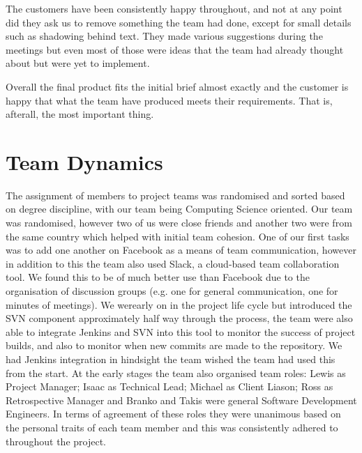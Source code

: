 \documentclass{l3proj}
\begin{document}
The customers have been consistently happy throughout, and not at any point did they ask us to remove something the team had done, except for small details such
as shadowing behind text. They made various suggestions during the meetings but even most of those were ideas that the team had already thought about but were
yet to implement.

Overall the final product fits the initial brief almost exactly and the customer is happy that what the team have produced meets their requirements. That
is, afterall, the most important thing.



\section{Team Dynamics}
\label{sec:team-dynamics}

The assignment of members to project teams was randomised and sorted based on degree discipline, with our team being
Computing Science oriented. Our team was randomised, however two of us were close friends and another two were from the
same country which helped with initial team cohesion. One of our first tasks was to add one another on Facebook as a means of
team communication, however in addition to this the team also used Slack, a cloud-based team collaboration tool. We found this to
be of much better use than Facebook due to the organisation of discussion groups (e.g. one for general communication, one for
minutes of meetings). We werearly on in the project life cycle
but introduced the SVN component approximately half way through the process, the team were also able to integrate Jenkins and SVN into this tool to monitor the success of project builds,
and also to monitor when new commits are made to the repository. We had Jenkins integration in hindsight the team wished the team had used this from the
start. At the early stages the team also organised team roles: Lewis as Project Manager; Isaac as Technical Lead; Michael as Client Liason;
Ross as Retrospective Manager and Branko and Takis were general Software Development Engineers. In terms of agreement of these roles they were unanimous
based on the personal traits of each team member and this was consistently adhered to throughout the project.
\end{document}

